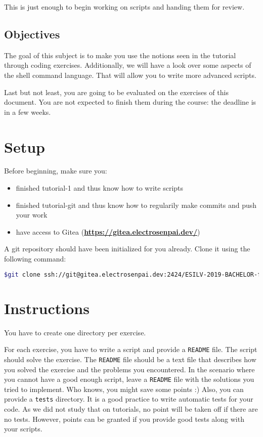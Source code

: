 \documentclass[12pt]{article}
\let\oldhref\href
\renewcommand{\href}[2]{\oldhref{#1}{\bfseries#2}}
\begin{document}
This is just enough to begin working on scripts and handing them for review.

\subsection{Objectives}

The goal of this subject is to make you use the notions seen in the tutorial through coding exercises.
Additionally, we will have a look over some aspects of the shell command language. That will allow you to write more advanced scripts.

Last but not least, you are going to be evaluated on the exercises of this document. You are not expected to finish them during the course: the deadline is in a few weeks.

\section{Setup}

Before beginning, make sure you:

\begin{itemize}
	\item finished tutorial-1 and thus know how to write scripts
	\item finished tutorial-git and thus know how to regularily make commits and push your work
	\item have access to Gitea (\href{https://gitea.electrosenpai.dev/}{https://gitea.electrosenpai.dev/})
\end{itemize}

A git repository should have been initialized for you already. Clone it using the following command:

\begin{lstlisting}[language=bash]
$git clone ssh://git@gitea.electrosenpai.dev:2424/ESILV-2019-BACHELOR-firstname.lastname/shell-scripting.git
\end{lstlisting}

\section{Instructions}

You have to create one directory per exercise.

For each exercise, you have to write a script and provide a \texttt{README} file. The script should solve the exercise. The \texttt{README} file should be a text file that describes how you solved the exercise and the problems you encountered. In the scenario where you cannot have a good enough script, leave a \texttt{README} file with the solutions you tried to implement. Who knows, you might save some points :) Also, you can provide a \texttt{tests} directory. It is a good practice to write automatic tests for your code. As we did not study that on tutorials, no point will be taken off if there are no tests. However, points can be granted if you provide good tests along with your scripts.
\end{document}
